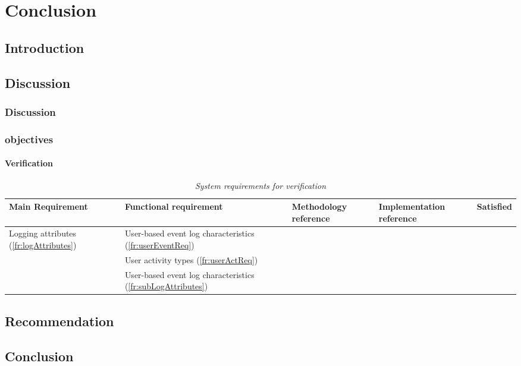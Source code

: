 \chapter{Conclusion}
\label{chap:4}

\section{Introduction}
\section{Discussion}

\subsection{Discussion}

\subsection{objectives}

\begin{landscape}
	\subsubsection{Verification}

	\begin{table}[!htb]
		\centering
		\small
		\caption[System requirements for verification]
		{\textit{System requirements for verification}}
		\label{tbl:ch2_verification}
		\begin{tabularx}{\linewidth}{|l|X|X|X|c|}
			\hline \textbf{Main Requirement} & \textbf{Functional requirement} & \textbf{Methodology reference} & \textbf{Implementation reference} & \textbf{Satisfied} \\ 
			\hline \multirow{3}{*}{Logging attributes (\ref{fr:logAttributes})} & User-based event log characteristics (\ref{fr:userEventReq}) & \Cref{sec:ch2_requirementsOfUAT} &  & \cmark \\
				& User activity types (\ref{fr:userActReq}) & \Cref{sec:ch2_userActivityTypes} &  & \cmark \\ \cline{2-5}
				& User-based event log characteristics (\ref{fr:subLogAttributes}) & \Cref{sec:ch2_logAttributesRequirements} & \Cref{sec:ch3_implementationLogAtrributes} & \cmark \\ \cline{2-5}\cline{2-5}
			\hline
		\end{tabularx}
	\end{table}
\end{landscape}

\section{Recommendation}

\section{Conclusion}